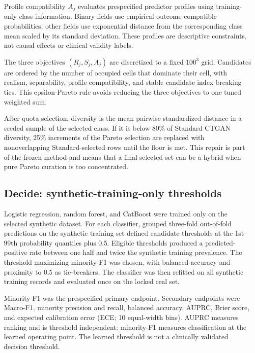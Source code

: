 Profile compatibility $A_j$ evaluates prespecified predictor profiles using training-only class information. Binary fields use empirical outcome-compatible probabilities; other fields use exponential distance from the corresponding class mean scaled by its standard deviation. These profiles are descriptive constraints, not causal effects or clinical validity labels.

The three objectives $(R_j,S_j,A_j)$ are discretized to a fixed $100^3$ grid. Candidates are ordered by the number of occupied cells that dominate their cell, with realism, separability, profile compatibility, and stable candidate index breaking ties. This epsilon-Pareto rule avoids reducing the three objectives to one tuned weighted sum.

After quota selection, diversity is the mean pairwise standardized distance in a seeded sample of the selected class. If it is below 80\% of Standard CTGAN diversity, 25\% increments of the Pareto selection are replaced with nonoverlapping Standard-selected rows until the floor is met. This repair is part of the frozen method and means that a final selected set can be a hybrid when pure Pareto curation is too concentrated.

\subsection{Decide: synthetic-training-only thresholds}

Logistic regression, random forest, and CatBoost \citep{prokhorenkova2018} were trained only on the selected synthetic dataset. For each classifier, grouped three-fold out-of-fold predictions on the synthetic training set defined candidate thresholds at the 1st--99th probability quantiles plus 0.5. Eligible thresholds produced a predicted-positive rate between one half and twice the synthetic training prevalence. The threshold maximizing minority-F1 was chosen, with balanced accuracy and proximity to 0.5 as tie-breakers. The classifier was then refitted on all synthetic training records and evaluated once on the locked real set.

Minority-F1 was the prespecified primary endpoint. Secondary endpoints were Macro-F1, minority precision and recall, balanced accuracy, AUPRC, Brier score, and expected calibration error (ECE; 10 equal-width bins). AUPRC measures ranking and is threshold independent; minority-F1 measures classification at the learned operating point. The learned threshold is not a clinically validated decision threshold.

